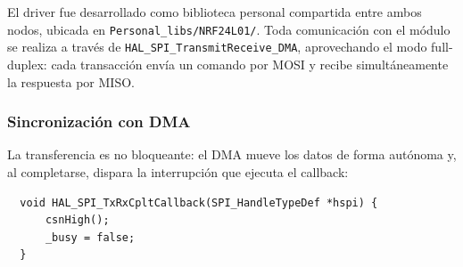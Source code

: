 \documentclass[12pt,a4paper]{article}
\begin{document}
  El driver fue desarrollado como biblioteca personal compartida entre ambos nodos, ubicada en \texttt{Personal\_libs/NRF24L01/}. Toda comunicación con el módulo se realiza a través de \texttt{HAL\_SPI\_TransmitReceive\_DMA}, aprovechando el modo        
  full-duplex: cada transacción envía un comando por MOSI y recibe simultáneamente la respuesta por MISO.
                                                                                                                                                                                                                                                              
                                                                                                                                                                                                                                                              
  \subsubsection{Sincronización con DMA}                                                                                                                                                                                                                      
  
  La transferencia es no bloqueante: el DMA mueve los datos de forma autónoma y, al completarse, dispara la interrupción que ejecuta el callback:                                                                                                             
  
  \begin{verbatim}                                                                                                                                                                                                                                            
  void HAL_SPI_TxRxCpltCallback(SPI_HandleTypeDef *hspi) {
      csnHigh();                                                                                                                                                                                                                                              
      _busy = false;
  }                                                                                                                                                                                                                                                           
  \end{verbatim}                                                                                                                                                                                                                                              
  
\end{document}
